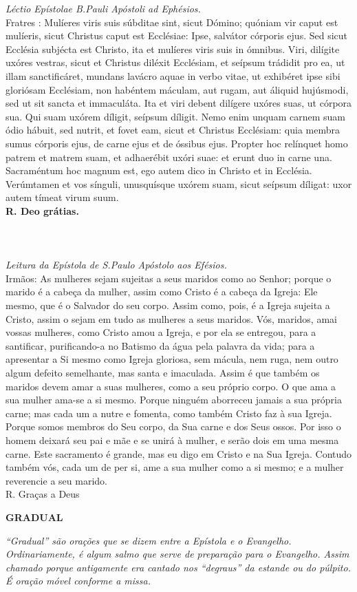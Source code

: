\begin{multicols}{2}
	\noindent
	\textit{Léctio Epístolae B.Pauli Apóstoli ad Ephésios.}
	\\ Fratres : Mulíeres viris suis súbditae sint, sicut Dómino; quóniam vir caput est mulíeris, sicut Christus caput est Ecclésiae: Ipse, salvátor córporis ejus. Sed sicut Ecclésia subjécta est Christo, ita et mulíeres viris suis in ómnibus. Viri, dilígite uxóres vestras, sicut et Christus diléxit Ecclésiam, et seípsum trádidit pro ea, ut illam sanctificáret, mundans lavácro aquae in verbo vitae, ut exhibéret ipse sibi gloriósam Ecclésiam, non habéntem máculam, aut rugam, aut áliquid hujúsmodi, sed ut sit sancta et immaculáta. Ita et viri debent dilígere uxóres suas, ut córpora sua. Qui suam uxórem díligit, seípsum díligit. Nemo enim unquam carnem suam ódio hábuit, sed nutrit, et fovet eam, sicut et Christus Ecclésiam: quia membra sumus córporis ejus, de carne ejus et de óssibus ejus. Propter hoc relínquet homo patrem et matrem suam, et adhaerébit uxóri suae: et erunt duo in carne una. Sacraméntum hoc magnum est, ego autem dico in Christo et in Ecclésia. Verúmtamen et vos sínguli, unusquísque uxórem suam, sicut seípsum díligat: uxor autem tímeat virum suum.	
	\\ \textbf{	R. Deo grátias. }
	\\
	\\
	\\
	\\ \textit{Leitura da Epístola de S.Paulo Apóstolo aos Efésios.}
	\\ Irmãos: As mulheres sejam sujeitas a seus maridos como ao Senhor; porque o marido é a cabeça da mulher, assim como Cristo é a cabeça da Igreja: Ele mesmo, que é o Salvador do seu corpo. Assim como, pois, é a Igreja sujeita a Cristo, assim o sejam em tudo as mulheres a seus maridos. Vós, maridos, amai vossas mulheres, como Cristo amou a Igreja, e por ela se entregou, para a santificar, purificando-a no Batismo da água pela palavra da vida; para a apresentar a Si mesmo como Igreja gloriosa, sem mácula, nem ruga, nem outro algum defeito semelhante, mas santa e imaculada. Assim é que também os maridos devem amar a suas mulheres, como a seu próprio corpo. O que ama a sua mulher ama-se a si mesmo. Porque ninguém aborreceu jamais a sua própria carne; mas cada um a nutre e fomenta, como também Cristo faz à sua Igreja. Porque somos membros do Seu corpo, da Sua carne e dos Seus ossos. Por isso o homem deixará seu pai e mãe e se unirá à mulher, e serão dois em uma mesma carne. Este sacramento é grande, mas eu digo em Cristo e na Sua Igreja. Contudo também vós, cada um de per si, ame a sua mulher como a si mesmo; e a mulher reverencie a seu marido.
	\\ R. Graças a Deus
\end{multicols}
\begin{center}
	\textbf{GRADUAL}
\end{center}
\textit{“Gradual” são orações que se dizem entre a Epístola e o Evangelho. Ordinariamente, é algum salmo que serve de preparação para o Evangelho. Assim chamado porque antigamente era cantado nos “degraus” da estande ou do púlpito. É oração móvel conforme a missa.}

